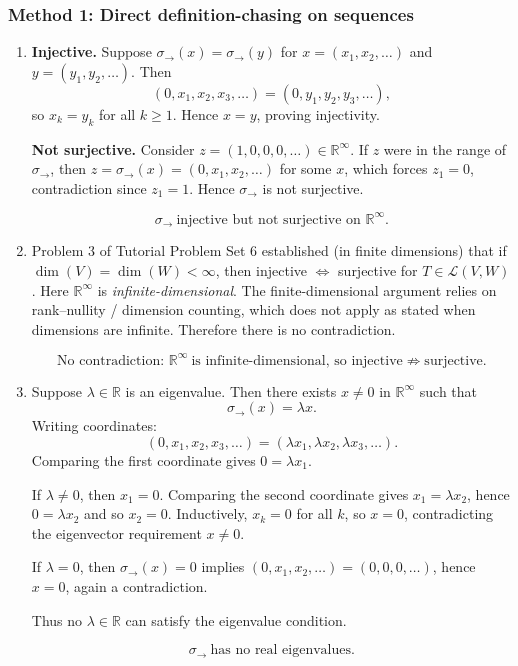\documentclass[12pt]{article}
\newcommand{\R}{\mathbb{R}}
\newcommand{\cL}{\mathcal{L}}
\begin{document}
\subsubsection{Method 1: Direct definition-chasing on sequences}
\begin{enumerate}[label=(\alph*)]
\item \textbf{Injective.}
Suppose $\sigma_{\rightarrow}(x)=\sigma_{\rightarrow}(y)$ for $x=(x_1,x_2,\dots)$ and $y=(y_1,y_2,\dots)$.
Then
\[
(0,x_1,x_2,x_3,\dots)=(0,y_1,y_2,y_3,\dots),
\]
so $x_k=y_k$ for all $k\ge 1$. Hence $x=y$, proving injectivity.

\medskip
\noindent\textbf{Not surjective.}
Consider $z=(1,0,0,0,\dots)\in\R^\infty$. If $z$ were in the range of $\sigma_{\rightarrow}$, then
$z=\sigma_{\rightarrow}(x)=(0,x_1,x_2,\dots)$ for some $x$, which forces $z_1=0$, contradiction since $z_1=1$.
Hence $\sigma_{\rightarrow}$ is not surjective.

\[
\boxed{\,\sigma_{\rightarrow}\ \text{injective but not surjective on }\R^\infty.\,}
\]

\item Problem 3 of Tutorial Problem Set 6 established (in finite dimensions) that if $\dim(V)=\dim(W)<\infty$, then
injective $\Leftrightarrow$ surjective for $T\in\cL(V,W)$. Here $\R^\infty$ is \emph{infinite-dimensional}.
The finite-dimensional argument relies on rank--nullity / dimension counting, which does not apply as stated when dimensions are infinite.
Therefore there is no contradiction.

\[
\boxed{\,\text{No contradiction: }\R^\infty\ \text{is infinite-dimensional, so injective}\nRightarrow\text{surjective.}\,}
\]

\item Suppose $\lambda\in\R$ is an eigenvalue. Then there exists $x\neq 0$ in $\R^\infty$ such that
\[
\sigma_{\rightarrow}(x)=\lambda x.
\]
Writing coordinates:
\[
(0,x_1,x_2,x_3,\dots)=(\lambda x_1,\lambda x_2,\lambda x_3,\dots).
\]
Comparing the first coordinate gives $0=\lambda x_1$.

If $\lambda\neq 0$, then $x_1=0$. Comparing the second coordinate gives $x_1=\lambda x_2$, hence $0=\lambda x_2$ and so $x_2=0$.
Inductively, $x_k=0$ for all $k$, so $x=0$, contradicting the eigenvector requirement $x\neq 0$.

If $\lambda=0$, then $\sigma_{\rightarrow}(x)=0$ implies $(0,x_1,x_2,\dots)=(0,0,0,\dots)$, hence $x=0$, again a contradiction.

Thus no $\lambda\in\R$ can satisfy the eigenvalue condition.

\[
\boxed{\,\sigma_{\rightarrow}\ \text{has no real eigenvalues.}\,}
\]
\end{enumerate}
\end{document}
